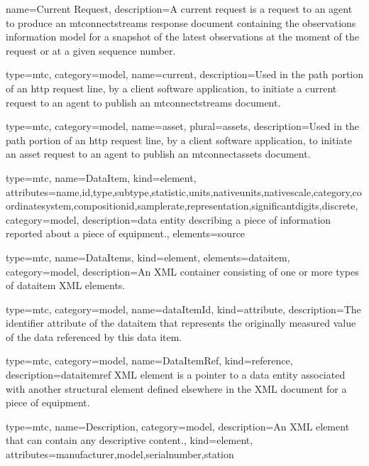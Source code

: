 {
  name={Current Request},
  description={A \gls{current request} is a \gls{request} to an \gls{agent} to produce an \gls{mtconnectstreams response document} containing the \gls{observations information model} for a snapshot of the latest \glspl{observation} at the moment of the \gls{request} or at a given \gls{sequence number}.}
}


{
  type=mtc,
  category=model,
  name={current},
  description={Used in the path portion of an \gls{http request line}, by a client software application, to initiate a \gls{current request} to an \gls{agent} to publish an \gls{mtconnectstreams} document.}
}

{
  type=mtc,
  category=model,
  name={asset},
  plural={assets},
  description={Used in the path portion of an \gls{http request line}, by a client software application, to initiate an \gls{asset request} to an \gls{agent} to publish an \gls{mtconnectassets} document.}
}



{
  type=mtc,
  name={DataItem},
  kind={element},
  attributes={\gls{name},\gls{id},\gls{type},\gls{subtype},\gls{statistic},\gls{units},\gls{nativeunits},\gls{nativescale},\gls{category},\gls{coordinatesystem},\gls{compositionid},\gls{samplerate},\gls{representation},\gls{significantdigits},\gls{discrete}},
  category=model,
  description={\gls{data entity} describing a piece of information reported about a piece of equipment.},
  elements={\gls{source}}
}

{
  type=mtc,
  name={DataItems},
  kind={element},
  elements={\gls{dataitem}},
  category=model,
  description={An XML container consisting of one or more types of \gls{dataitem} XML elements.}
}

{
  type=mtc,
  category=model,
  name={dataItemId},
  kind={attribute},
  description={The identifier attribute of the \gls{dataitem} that represents the originally measured value of the data referenced by this data item.}
}


{
  type=mtc,
  category=model,
  name={DataItemRef},
  kind={reference},
  description={\gls{dataitemref} XML element is a pointer to a \gls{data entity} associated with another \gls{structural element} defined elsewhere in the XML document for a piece of equipment.}
}


{
  type=mtc,
  name={Description},
  category=model,
  description={An XML element that can contain any descriptive content.},
  kind={element},
  attributes={\gls{manufacturer},\gls{model},\gls{serialnumber},\gls{station}}
}


